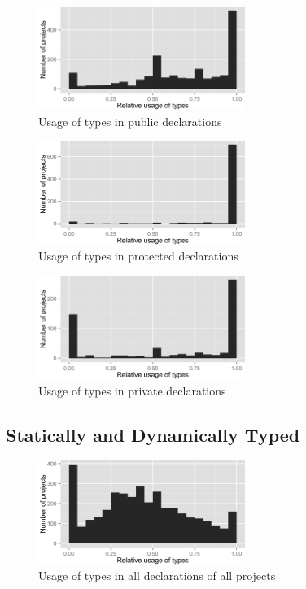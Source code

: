 \begin{figure}[h]
\centering 
\includegraphics[width=0.6\textwidth]{../aosd_2014/analysis/result/background/dynamic-only/histograms/13_Public.png} 
\caption{Usage of types in public declarations}
\end{figure}

\begin{figure}[h]
\centering 
\includegraphics[width=0.6\textwidth]{../aosd_2014/analysis/result/background/dynamic-only/histograms/12_Protected.png} 
\caption{Usage of types in protected declarations}
\end{figure}

\begin{figure}[h]
\centering 
\includegraphics[width=0.6\textwidth]{../aosd_2014/analysis/result/background/dynamic-only/histograms/11_Private.png} 
\caption{Usage of types in private declarations}
\end{figure}

\clearpage
\subsection*{Statically and Dynamically Typed}

\begin{figure}[h]
\centering 
\includegraphics[width=0.6\textwidth]{../aosd_2014/analysis/result/background/static-and-dynamic/histograms/5_all_types.png} 
\caption{Usage of types in all declarations of all projects}
\end{figure}

